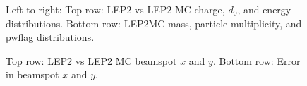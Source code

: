 \begin{figure}[H]
\hfill
\caption{Left to right: Top row: LEP2 vs LEP2 MC charge, $d_0$, and energy distributions. Bottom row: LEP2MC mass, particle multiplicity, and pwflag distributions.}
\end{figure}

\begin{figure}[H]
\centering
{}\hfill
{}\hfill %
\hfill
{}\hfill
\caption{Top row: LEP2 vs LEP2 MC beamspot $x$ and $y$. Bottom row: Error in beamspot $x$ and $y$.}
\end{figure}

